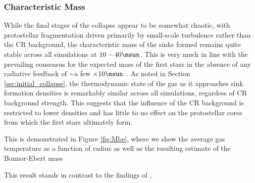 \subsubsection{Characteristic Mass}

While the final stages of the collapse appear to be somewhat chaotic, with protostellar fragmentation driven primarily by small-scale turbulence rather than the CR background, the characteristic mass of the sinks formed remains quite stable across all simulations at $10-40\msun$.
This is very much in line with the prevailing consensus for the expected mass of the first stars in the absence of any radiative feedback of $\sim$a few $\times10\msun$ \citep{Bromm2013}.  
As noted in Section \ref{sec:initial_collapse}, the thermodynamic state of the gas as it approaches sink formation densities is remarkably similar across all simulations, regardess of CR background strength.
This suggests that the influence of the CR background is restricted to lower densities and has little to no effect on the protostellar cores from which the first stars ultimately form.

This is demonstrated in Figure \ref{fig:Mbe}, where we show the average gas temperature as a function of radius as well as the resulting estimate of the Bonnor-Ebert mass

This result stands in contrast to the findings of \citet{StacyBromm2007}, 